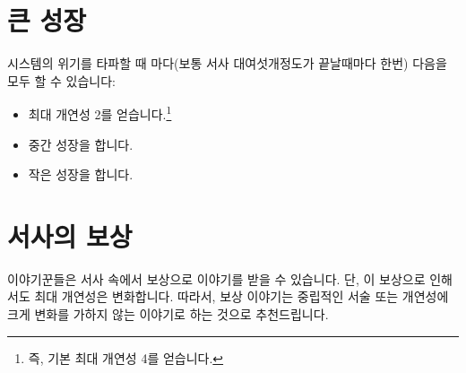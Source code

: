 \documentclass{report}
\begin{document}
	\section*{큰 성장}
	시스템의 위기를 타파할 때 마다(보통 서사 대여섯개정도가 끝날때마다 한번) 다음을 모두 할 수 있습니다:
	\begin{itemize}
		\item 최대 개연성 2를 얻습니다.\footnote{\label{lite-big-upgrade-cost}즉, 기본 최대 개연성 4를 얻습니다.}
		\item 중간 성장을 합니다.
		\item 작은 성장을 합니다.
	\end{itemize}
	
	\section*{서사의 보상}
	이야기꾼들은 서사 속에서 보상으로 이야기를 받을 수 있습니다. 단, 이 보상으로 인해서도 최대 개연성은 변화합니다. 따라서, 보상 이야기는 중립적인 서술 또는 개연성에 크게 변화를 가하지 않는 이야기로 하는 것으로 추천드립니다.
\end{document}
